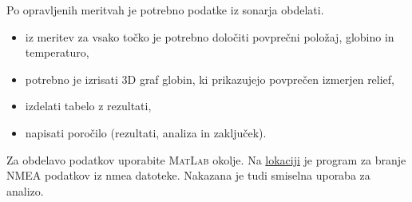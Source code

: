 \documentclass[11pt]{article}
\begin{document}
\noindent
Po opravljenih meritvah je potrebno podatke iz sonarja obdelati.
\begin{itemize}
	\item iz meritev za vsako točko je potrebno določiti povprečni položaj, globino in temperaturo,
	\item potrebno je izrisati 3D graf globin, ki prikazujejo povprečen izmerjen relief,
	\item izdelati tabelo z rezultati,
	\item napisati poročilo (rezultati, analiza in zaključek).
\end{itemize}

\noindent
Za obdelavo podatkov uporabite \textsc{MatLab} okolje. Na \href{https://drive.google.com/open?id=0B1dT-CBA07ANSXl2YmIxcXdUQkk}{lokaciji} je program za branje NMEA podatkov iz nmea datoteke. Nakazana je tudi smiselna uporaba za analizo.
\end{document}
